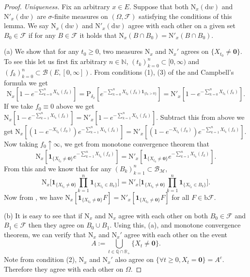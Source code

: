 \documentclass[12pt,a4paper]{amsart}
\numberwithin{equation}{section}
\theoremstyle{plain}
\theoremstyle{definition}
\theoremstyle{remark}
\begin{document}
\begin{proof}
\emph{Uniqueness.}
	Fix an arbitrary $x\in E$. 
	Suppose that both $\mathrm N_x(\mathrm dw)$ and $ \mathrm N'_x(\mathrm dw)$ are $\sigma$-finite measures on $(\Omega, \mathscr F)$ satisfying the conditions of this lemma. 
	We say $\mathrm N_x(\mathrm dw)$ and $ \mathrm N'_x(\mathrm dw)$ agree with each other on a given set $B_0\in \mathscr F$ if for any $B\in \mathscr F$ it holds that $\mathrm N_x(B\cap B_0) = \mathrm N'_x(B\cap B_0)$.

	(a) We show that for any $t_0\geq 0$, two measures $\mathrm N_x$ and $\mathrm N_x'$ agrees on $\{X_{t_0}\neq \mathbf 0\}$.
	To see this let us first fix arbitrary $n\in \mathbb N$, $(t_k)_{k=0}^n \subset [0,\infty)$ and $(f_k)_{k=0}^n \subset \mathcal B(E,[0,\infty])$.
	From conditions (1), (3) of the  and Campbell's formula we get
\begin{equation}
	\mathrm N_x [1 - e^{- \sum_{k=0}^n X_{t_k}(f_k) }]
	= \mathrm P_{\delta_x}[e^{-\sum_{k=0}^n X_{t_k}(f_k)\mathbf 1_{\{t_k >0\}}}]
	= \mathrm N'_x [1 - e^{- \sum_{k=0}^n X_{t_k}(f_k) }].
\end{equation}
	If we take $f_0\equiv 0$ above we get 
$
\mathrm N_x [1 - e^{- \sum_{k=1}^n X_{t_k}(f_k) }] = \mathrm N'_x [1 - e^{- \sum_{k=1}^n X_{t_k}(f_k) }].
$
	Subtract this from above we get
$
	\mathrm N_x [(1-e^{- X_{t_0}(f_0) }) e^{- \sum_{k=1}^n X_{t_k}(f_k) }]
	= \mathrm N'_x [(1-e^{- X_{t_0}(f_0) }) e^{- \sum_{k=1}^n X_{t_k}(f_k) }].
$ 
	Now taking $f_0 \uparrow \infty$, we get from monotone convergence theorem that
\[
	\mathrm N_x [\mathbf 1_{\{X_{t_0}\neq \mathbf 0\}} e^{- \sum_{k=1}^n X_{t_k}(f_k) }]
	= \mathrm N'_x [\mathbf 1_{\{X_{t_0}\neq \mathbf 0\}} e^{- \sum_{k=1}^n X_{t_k}(f_k) }].
\]
	From this and \cite[Theorem 1.17]{Li2011Measure-valued} we know that for any $(B_k)_{k=1}^n \subset \mathscr B_{\mathcal M}$,
\[
	\mathrm N_x \Big[\mathbf 1_{\{X_{t_0}\neq \mathbf 0\}} \prod_{k=1}^n \mathbf 1_{\{X_{t_k}\in B_k\}}\Big]
	= \mathrm N'_x \Big[\mathbf 1_{\{X_{t_0}\neq \mathbf 0\}} \prod_{k=1}^n \mathbf 1_{\{X_{t_k}\in B_k\}}\Big].
\]
	Now from \cite[Theorem A.06]{Sharpe1988General}, we have $\mathrm N_x [\mathbf 1_{\{X_{t_0}\neq \mathbf 0\}} F]= \mathrm N'_x [\mathbf 1_{\{X_{t_0}\neq \mathbf 0\}} F]$ for all $F\in \mathrm b\mathscr F$.
	
	(b) It is easy to see that if $\mathrm N_x$ and $\mathrm N_x$ agree with each other on both $B_0\in \mathscr F$ and $B_1\in \mathscr F$ then they agree on $B_0\cup B_1$. Using this, (a), and monotone convergence theorem, we can verify that $\mathrm N_x$ and $\mathrm N_x'$ agree with each other on the event \[A:=\bigcup_{t\in \mathbb Q\cap \mathbb R_+}\{X_t \neq \mathbf 0\}.\]
	Note from condition (2), $\mathrm N_x$ and $\mathrm N_x'$ also agree on $\{\forall t\geq 0, X_t = \mathbf 0\}=A^c$.
	Therefore they agree with each other on $\Omega$.
\end{proof}
\end{document}
